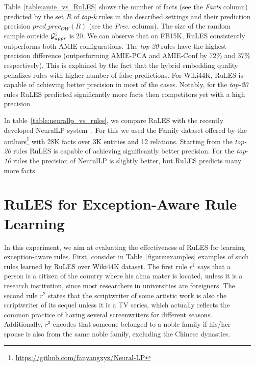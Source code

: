


Table~\ref{table:amie_vs_RuLES} shows the number of facts (see the \textit{Facts} column) predicted by %
the set $R$ of \textit{top-k} rules %
in the described settings %
and their prediction precision $pred\_prec_{OW}(R)$ (see the \textit{Prec.} column). %
The size of the random sample 
outside $\mathcal{G}^i_{appr}$ is 20. %
We can observe that on FB15K, RuLES consistently outperforms both AMIE configurations. The \textit{top-20} rules have the highest precision difference (outperforming AMIE-PCA and AMIE-Conf by $72\%$ and $37\%$ respectively).
This is explained by the fact that the hybrid embedding quality penalizes rules with higher number of false predictions. %
For Wiki44K, RuLES is capable of achieving better precision in most of the cases. %
Notably, for the \textit{top-20} rules RuLES predicted significantly more facts then competitors yet with a high precision. 

In table~\ref{table:neurallp_vs_rules}, we compare RuLES with the recently developed NeuralLP system~\cite{DBLP:conf/nips/YangYC17}. For this we used the Family dataset offered by the authors\footnote{\url{https://github.com/fanyangxyz/Neural-LP}} %
with 28K facts over 3K entities and 12 relations. %
Starting from the \textit{top-20} rules RuLES is capable of achieving significantly better precision. For the \textit{top-10} rules the precision of NeuralLP is slightly better, but RuLES predicts many more facts.



\section{RuLES for Exception-Aware Rule Learning}
In this experiment, we aim at evaluating the effectiveness of RuLES %
for learning exception-aware rules.
First, consider in Table~\ref{figure:examples} examples of such rules learned by RuLES over Wiki44K dataset. 
 The first rule $r^1$ says that a person is a citizen of the country where his alma mater is located, unless it is a research institution, %
since most %
researchers in universities are foreigners. The second rule $r^2$ states that the scriptwriter of some artistic work is also the scriptwriter of its sequel unless it is a TV series, which actually reflects the common practice of having several screenwriters for different seasons. Additionally, $r^3$ encodes that someone belonged to a %
noble family if his/her %
spouse is also from the same noble family, excluding the Chinese dynasties. %

